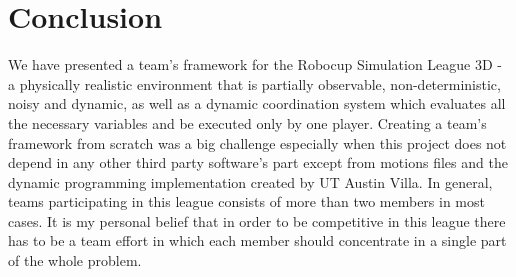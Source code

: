 \chapter{Conclusion}
\label{conclusion}

We have presented a team's framework for the Robocup Simulation League 3D - a physically realistic environment that is partially observable, non-deterministic, noisy and dynamic, as well as a dynamic coordination system which evaluates all the necessary variables and be executed only by one player. Creating a team's framework from scratch was a big challenge especially when this project does not depend in any other third party software's part except from motions files and the dynamic programming implementation created by UT Austin Villa. In general, teams participating in this league consists of more than two members in most cases. It is my personal belief that in order to be competitive in this league there has to be a team effort in which each member should concentrate in a single part of the whole problem.
 


